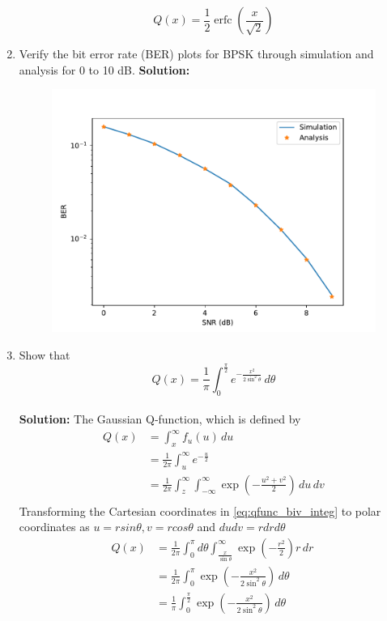 \documentclass[12pt]{book}
\newcommand{\solution}{\noindent \textbf{Solution: }}
\begin{document}
\begin{enumerate}
\begin{equation}
Q(x) = \frac{1}{2}\operatorname{erfc}\left({\frac {x}{{\sqrt {2}}}}\right)
\end{equation}
\item
Verify the bit error rate (BER) plots for BPSK through simulation and analysis for 0 to 10 dB.
\solution
\begin{center}
\end{center}
\begin{figure}[H]
\centering
\includegraphics[width=\columnwidth]{./figs/6/6.1.6.pdf}
\caption{}
\label{fig:6.1.6}
\end{figure}
\item
\label{prob:craigs_formula_proof}
Show that
\begin{equation}
Q(x) = \frac{1}{\pi}\int^{\frac{\pi}{2}}_{0}e^{-\frac{x^2}{2\sin^2 \theta}}\,d\theta
\end{equation}\\
\solution
The Gaussian Q‐function, which is defined by
\begin{align*}
Q(x) &= \int_{x}^{\infty} f_{u}(u) \,du \\
&=\frac{1}{2\pi }\int_{u}^{\infty}e^{-\frac{u}{2}}\\
&=\frac{1}{2\pi}\int_{z}^{\infty}\int_{-\infty}^{\infty} \exp\left(-\frac{u^2+v^2}{2}\right) \,du\,dv\\
\label{eq:qfunc_biv_integ}
\end{align*}
Transforming the  Cartesian coordinates in \eqref{eq:qfunc_biv_integ} to polar coordinates as $u= rsin\theta, v=rcos\theta$ and $du dv=r dr d\theta$ 
\begin{align*}
	Q(x) &= \frac{1}{2\pi}\int_{0}^{\pi} d\theta \int_{\frac{x}{\sin\theta}}^{\infty} \exp\left(-\frac{r^2}{2}\right)r \,dr\ \\
&= \frac{1}{2\pi}\int_{0}^{\pi} \exp\left(-\frac{x^2}{2\sin^2\theta}\right) \,d\theta\\
	&= \frac{1}{\pi}\int_{0}^{\frac{\pi}{2}} \exp\left(-\frac{x^2}{2\sin^2\theta}\right) \,d\theta 
\end{align*}
\end{enumerate}
\end{document}
